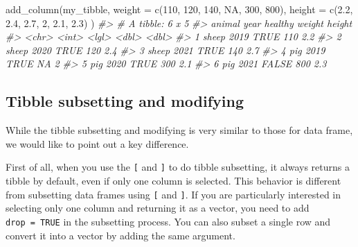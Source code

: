\documentclass[
]{book}
\newenvironment{Shaded}{\begin{snugshade}}{\end{snugshade}}
\newcommand{\AttributeTok}[1]{\textcolor[rgb]{0.77,0.63,0.00}{#1}}
\newcommand{\CommentTok}[1]{\textcolor[rgb]{0.56,0.35,0.01}{\textit{#1}}}
\newcommand{\ConstantTok}[1]{\textcolor[rgb]{0.00,0.00,0.00}{#1}}
\newcommand{\DecValTok}[1]{\textcolor[rgb]{0.00,0.00,0.81}{#1}}
\newcommand{\FloatTok}[1]{\textcolor[rgb]{0.00,0.00,0.81}{#1}}
\newcommand{\FunctionTok}[1]{\textcolor[rgb]{0.00,0.00,0.00}{#1}}
\newcommand{\NormalTok}[1]{#1}
\begin{document}
\begin{Shaded}
\begin{Highlighting}[]
\FunctionTok{add\_column}\NormalTok{(my\_tibble, }
           \AttributeTok{weight =} \FunctionTok{c}\NormalTok{(}\DecValTok{110}\NormalTok{, }\DecValTok{120}\NormalTok{, }\DecValTok{140}\NormalTok{, }\ConstantTok{NA}\NormalTok{, }\DecValTok{300}\NormalTok{, }\DecValTok{800}\NormalTok{),}
           \AttributeTok{height =} \FunctionTok{c}\NormalTok{(}\FloatTok{2.2}\NormalTok{, }\FloatTok{2.4}\NormalTok{, }\FloatTok{2.7}\NormalTok{, }\DecValTok{2}\NormalTok{, }\FloatTok{2.1}\NormalTok{, }\FloatTok{2.3}\NormalTok{)}
\NormalTok{           )}
\CommentTok{\#\textgreater{} \# A tibble: 6 x 5}
\CommentTok{\#\textgreater{}   animal  year healthy weight height}
\CommentTok{\#\textgreater{}   \textless{}chr\textgreater{}  \textless{}int\textgreater{} \textless{}lgl\textgreater{}    \textless{}dbl\textgreater{}  \textless{}dbl\textgreater{}}
\CommentTok{\#\textgreater{} 1 sheep   2019 TRUE       110    2.2}
\CommentTok{\#\textgreater{} 2 sheep   2020 TRUE       120    2.4}
\CommentTok{\#\textgreater{} 3 sheep   2021 TRUE       140    2.7}
\CommentTok{\#\textgreater{} 4 pig     2019 TRUE        NA    2  }
\CommentTok{\#\textgreater{} 5 pig     2020 TRUE       300    2.1}
\CommentTok{\#\textgreater{} 6 pig     2021 FALSE      800    2.3}
\end{Highlighting}
\end{Shaded}

\hypertarget{tibble-subsetting-and-modifying}{%
\subsection{Tibble subsetting and modifying}\label{tibble-subsetting-and-modifying}}

While the tibble subsetting and modifying is very similar to those for data frame, we would like to point out a key difference.

First of all, when you use the \texttt{{[}} and \texttt{{]}} to do tibble subsetting, it always returns a tibble by default, even if only one column is selected. This behavior is different from subsetting data frames using \texttt{{[}} and \texttt{{]}}. If you are particularly interested in selecting only one column and returning it as a vector, you need to add \texttt{drop\ =\ TRUE} in the subsetting process. You can also subset a single row and convert it into a vector by adding the same argument.
\end{document}
